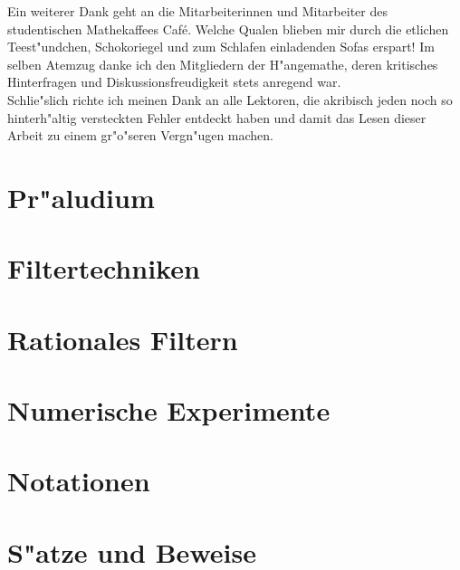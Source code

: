 \documentclass[11pt, twoside]{report} %
\begin{document}
Ein weiterer Dank geht an die Mitarbeiterinnen und Mitarbeiter des studentischen Mathekaffees  Caf\'e\grqq. Welche Qualen blieben mir durch
die etlichen Teest"undchen, Schokoriegel und zum Schlafen einladenden Sofas erspart! Im selben Atemzug
danke ich den Mitgliedern der \glqq H"angemathe\grqq, deren kritisches Hinterfragen und Diskussionsfreudigkeit stets anregend war.\\

Schlie"slich richte ich meinen Dank an alle Lektoren, die akribisch jeden noch so hinterh"altig versteckten
Fehler entdeckt haben und damit das Lesen dieser Arbeit zu einem gr"o"seren Vergn"ugen machen.\\

\tableofcontents

\chapter{Pr"aludium}%


\chapter{Filtertechniken} %


\chapter{Rationales Filtern}%


\chapter{Numerische Experimente}


%

\appendix
\chapter{Notationen}


\chapter{S"atze und Beweise}





\nocite{*}
\printbibliography
\end{document}
